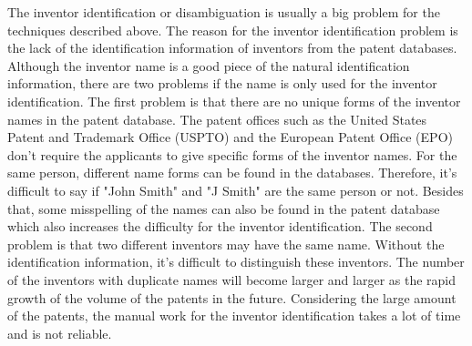 The inventor identification or disambiguation is usually a big problem for the techniques described above. The reason for the inventor identification problem is the lack of the identification information of inventors from the patent databases. Although the inventor name is a good piece of the natural identification information, there are two problems if the name is only used for the inventor identification. The first problem is that there are no unique forms of the inventor names in the patent database. The patent offices such as the United States Patent and Trademark Office (USPTO) and the European Patent Office (EPO)  don't require the applicants to give specific forms of the inventor names. For the same person, different name forms can be found in the databases. Therefore, it's difficult to say if "John Smith" and "J Smith" are the same person or not. Besides that, some misspelling of the names can also be found in the patent database which also increases the difficulty for the inventor identification. The second problem is that two different inventors may have the same name. Without the identification information, it's difficult to distinguish these inventors. The number of the inventors with duplicate names will become larger and larger as the rapid growth of the volume of the patents in the future. Considering the large amount of the patents, the manual work for the inventor identification takes a lot of time and is not reliable.  \newline


